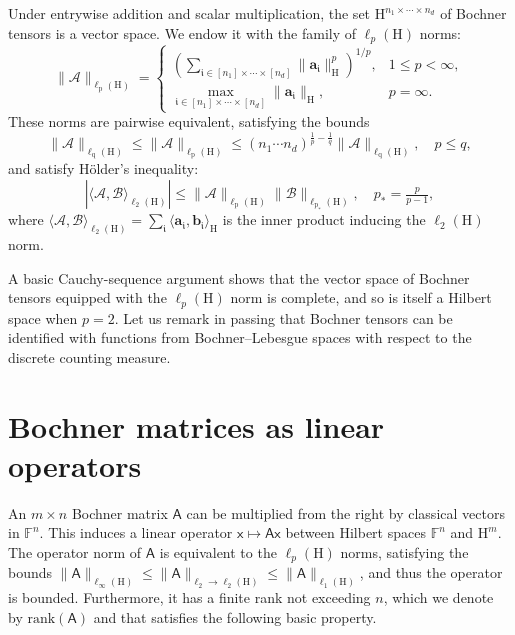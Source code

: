 \documentclass[onefignum,onetabnum]{siamart250211}
\renewenvironment{equation*}{\[}{\]\ignorespacesafterend}
\newcommand{\F}{\mathbb{F}}
\newcommand{\Hilb}{\mathrm{H}}
\newcommand{\Bensor}[1]{\bm{\Tensor{#1}}}
\newcommand{\Tensor}[1]{{\mathscr{#1}}}
\newcommand{\Batrix}[1]{\bm{\Matrix{#1}}}
\newcommand{\Matrix}[1]{\mathsf{#1}}
\newcommand{\Bentry}[1]{{\bm{#1}}}
\newcommand{\rank}[2][]{\mathrm{rank} #1( #2 #1)}
\newcommand{\mIndex}[1]{\mathfrak{#1}}
\newcommand{\Norm}[3][]{#1\| #2 #1\|_{\mathrm{#3}}}
\newcommand{\Dotp}[4][]{#1\langle #2, #3 #1\rangle_{\mathrm{#4}}}
\begin{document}
Under entrywise addition and scalar multiplication, the set $\Hilb^{n_1 \times \cdots \times n_d}$ of Bochner tensors is a vector space.
We endow it with the family of $\ell_p(\Hilb)$ norms:
\begin{equation*}
    \Norm{\Bensor{A}}{\ell_p(\Hilb)} =
        \begin{cases}
            \left( \sum_{\mIndex{i} \in [n_1] \times \cdots \times [n_d]} \Norm{\Bentry{a}_{\mIndex{i}}}{\Hilb}^p \right)^{1/p}, & 1 \leq p < \infty, \\
            \max_{\mIndex{i} \in [n_1] \times \cdots \times [n_d]} \Norm{\Bentry{a}_{\mIndex{i}}}{\Hilb}, & p = \infty.
        \end{cases}
\end{equation*}
These norms are pairwise equivalent, satisfying the bounds
\begin{equation*}
    \Norm{\Bensor{A}}{\ell_q(\Hilb)} \leq \Norm{\Bensor{A}}{\ell_{p}(\Hilb)} \leq (n_1 \cdots n_d)^{\frac{1}{p} - \frac{1}{q}} \Norm{\Bensor{A}}{\ell_q(\Hilb)}, \quad p \leq q,
\end{equation*}
and satisfy H\"older's inequality:
\begin{equation*}
    |\Dotp{\Bensor{A}}{\Bensor{B}}{\ell_2(\Hilb)}| \leq \Norm{\Bensor{A}}{\ell_p(\Hilb)} \Norm{\Bensor{B}}{\ell_{p_\ast}(\Hilb)}, \quad p_{\ast} = \tfrac{p}{p-1},
\end{equation*}
where $\Dotp{\Bensor{A}}{\Bensor{B}}{\ell_2(\Hilb)} = \sum_{\mIndex{i}} \Dotp{\Bentry{a}_{\mIndex{i}}}{\Bentry{b}_{\mIndex{i}}}{\Hilb}$ is the inner product inducing the $\ell_2(\Hilb)$ norm.

A basic Cauchy-sequence argument shows that the vector space of Bochner tensors equipped with the $\ell_p(\Hilb)$ norm is complete, and so is itself a Hilbert space when $p = 2$.
Let us remark in passing that Bochner tensors can be identified with functions from Bochner--Lebesgue spaces with respect to the discrete counting measure.
\section{Bochner matrices as linear operators}
\label{sec:bmx_op}
An $m \times n$ Bochner matrix $\Batrix{A}$ can be multiplied from the right by classical vectors in $\F^n$.
This induces a linear operator $\Matrix{x} \mapsto \Batrix{A} \Matrix{x}$ between Hilbert spaces $\F^{n}$ and $\Hilb^{m}$.
The operator norm of $\Batrix{A}$ is equivalent to the $\ell_p(\Hilb)$ norms, satisfying the bounds $\Norm{\Batrix{A}}{\ell_{\infty}(\Hilb)} \leq \Norm{\Batrix{A}}{\ell_2 \to \ell_2(\Hilb)} \leq \Norm{\Batrix{A}}{\ell_1(\Hilb)}$, and thus the operator is bounded.
Furthermore, it has a finite rank not exceeding $n$, which we denote by $\rank{\Batrix{A}}$ and that satisfies the following basic property.
\end{document}
